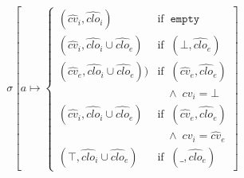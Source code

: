 \documentclass[12pt,draft]{article}
\newcommand{\store}[0]{\sigma}
\begin{document}
\begin{multicols*}{2}
  \[
    \store[a \mapsto \begin{cases}
      (\hat{cv}_i, \widehat{clo}_i)
      & \text{if}\;\; \texttt{empty} \\
      (\hat{cv}_i , \widehat{clo}_i \cup \widehat{clo}_e)
      & \text{if}\;\; (\bot, \widehat{clo}_e) \\
      (\hat{cv}_e , \widehat{clo}_i \cup \widehat{clo}_e))
      & \text{if}\;\; (\hat{cv}_e, \widehat{clo}_e) \\
      &\;\;\; \land \; \hat{cv}_i = \bot \\
      (\hat{cv}_i , \widehat{clo}_i \cup \widehat{clo}_e)
      & \text{if}\;\; (\hat{cv}_e , \widehat{clo}_e) \\
      &\;\;\; \land \; \hat{cv}_i = \hat{cv}_e \\
      (\top , \widehat{clo}_i \cup \widehat{clo}_e)
      & \text{if}\;\; (\_, \widehat{clo}_e)
    \end{cases}]
  \]
\end{multicols*}

\newpage
\end{document}

